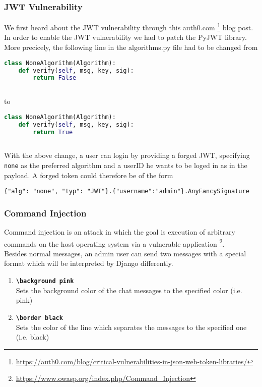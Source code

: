 \documentclass[12pt,a4paper]{article}
\newcommand{\code}[1]{\texttt{#1}}
\begin{document}
\subsubsection{JWT Vulnerability}
We first heard about the JWT vulnerability through this auth0.com \footnote{\url{https://auth0.com/blog/critical-vulnerabilities-in-json-web-token-libraries/}} blog post.
In order to enable the JWT vulnerability we had to patch the PyJWT library. More precicely, the following line in the algorithms.py file had to be changed from

\begin{lstlisting}[language=python]
class NoneAlgorithm(Algorithm):
    def verify(self, msg, key, sig):
        return False
 
 \end{lstlisting}
 to 
 \begin{lstlisting}[language=python]
class NoneAlgorithm(Algorithm):
    def verify(self, msg, key, sig):
        return True
  
  \end{lstlisting}
 
 With the above change, a user can login by providing a forged JWT, specifying \code{none} as the preferred algorithm and a userID he wants to be loged in as in the payload. A forged token could therefore be of the form
 \begin{verbatim}
{"alg": "none", "typ": "JWT"}.{"username":"admin"}.AnyFancySignature
  \end{verbatim}

\subsubsection{Command Injection}
Command injection is an attack in which the goal is execution of arbitrary commands on the host operating system via a vulnerable application \footnote{\url{https://www.owasp.org/index.php/Command_Injection}}.\\
Besides normal messages, an admin user can send two messages with a special format which will be interpreted by Django differently.
\begin{enumerate}
\item \textbf{\code{\textbackslash background pink} } \\
Sets the background color of the chat messages to the specified color (i.e. pink)
\item \textbf{\code{\textbackslash border black} } \\
Sets the color of the line which separates the messages to the specified one (i.e. black) 
\end{enumerate}
\end{document}
